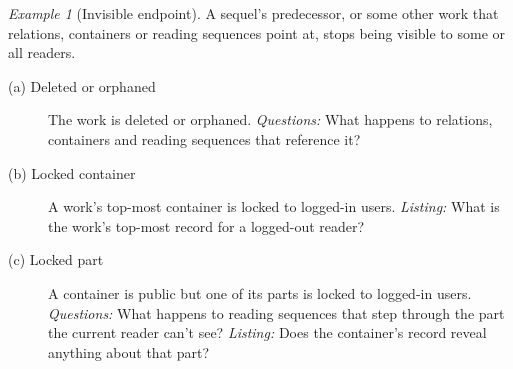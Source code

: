 \documentclass{amsart}
\theoremstyle{remark}
\newtheorem{eg}{Example}
\begin{document}
    \begin{eg}[Invisible endpoint]\label{eg:invisible}
        A sequel's predecessor, or some other work that relations, containers or reading sequences point at, stops being visible to some or all readers.
        \begin{description}
          \item[(a) Deleted or orphaned] The work is deleted or orphaned.
          \emph{Questions:} What happens to relations, containers and reading sequences that reference it?
          \item[(b) Locked container] A work's top-most container is locked to logged-in users.
          \emph{Listing:} What is the work's top-most record for a logged-out reader?
          \item[(c) Locked part] A container is public but one of its parts is locked to logged-in users.
          \emph{Questions:} What happens to reading sequences that step through the part the current reader can't see?
          \emph{Listing:} Does the container's record reveal anything about that part?
        \end{description}
    \end{eg}
\end{document}
